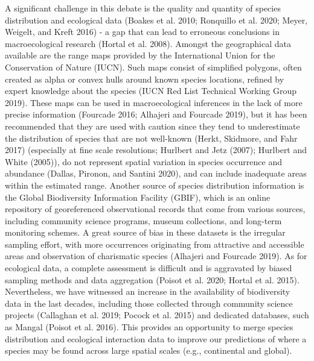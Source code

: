\documentclass[10pt,oneside]{article}
\begin{document}
A significant challenge in this debate is the quality and quantity of
species distribution and ecological data (Boakes et al. 2010; Ronquillo
et al. 2020; Meyer, Weigelt, and Kreft 2016) - a gap that can lead to
erroneous conclusions in macroecological research (Hortal et al. 2008).
Amongst the geographical data available are the range maps provided by
the International Union for the Conservation of Nature (IUCN). Such maps
consist of simplified polygons, often created as alpha or convex hulls
around known species locations, refined by expert knowledge about the
species (IUCN Red List Technical Working Group 2019). These maps can be
used in macroecological inferences in the lack of more precise
information (Fourcade 2016; Alhajeri and Fourcade 2019), but it has been
recommended that they are used with caution since they tend to
underestimate the distribution of species that are not well-known
(Herkt, Skidmore, and Fahr 2017) (especially at fine scale resolutions;
Hurlbert and Jetz (2007); Hurlbert and White (2005)), do not represent
spatial variation in species occurrence and abundance (Dallas, Pironon,
and Santini 2020), and can include inadequate areas within the estimated
range. Another source of species distribution information is the Global
Biodiversity Information Facility (GBIF), which is an online repository
of georeferenced observational records that come from various sources,
including community science programs, museum collections, and long-term
monitoring schemes. A great source of bias in these datasets is the
irregular sampling effort, with more occurrences originating from
attractive and accessible areas and observation of charismatic species
(Alhajeri and Fourcade 2019). As for ecological data, a complete
assessment is difficult and is aggravated by biased sampling methods and
data aggregation (Poisot et al. 2020; Hortal et al. 2015). Nevertheless,
we have witnessed an increase in the availability of biodiversity data
in the last decades, including those collected through community science
projects (Callaghan et al. 2019; Pocock et al. 2015) and dedicated
databases, such as Mangal (Poisot et al. 2016). This provides an
opportunity to merge species distribution and ecological interaction
data to improve our predictions of where a species may be found across
large spatial scales (e.g., continental and global).
\end{document}

